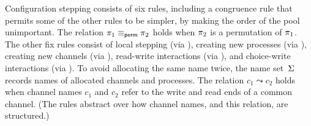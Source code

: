 Configuration stepping consists of six rules, including a congruence
rule  that permits some of the other rules to be simpler, by making
the order of the pool unimportant. The relation
$\pi_1 \equiv_\textsf{perm} \pi_2$ holds when $\pi_2$ is a permutation of
$\pi_1$.
%
The other fix rules consist of local stepping (via ),
creating new processes (via ),
creating new channels (via ),
read-write interactions (via ),
and choice-write interactions (via ).
%
To avoid allocating the same name twice, 
the name set~$\Sigma$ records names of allocated channels and processes.
%
The relation $c_1 \leadsto c_2$ holds when 
channel names $c_1$ and $c_2$ refer to the 
write and read ends of a common channel.
%
(The rules abstract over how channel names, and this relation, are structured.)


